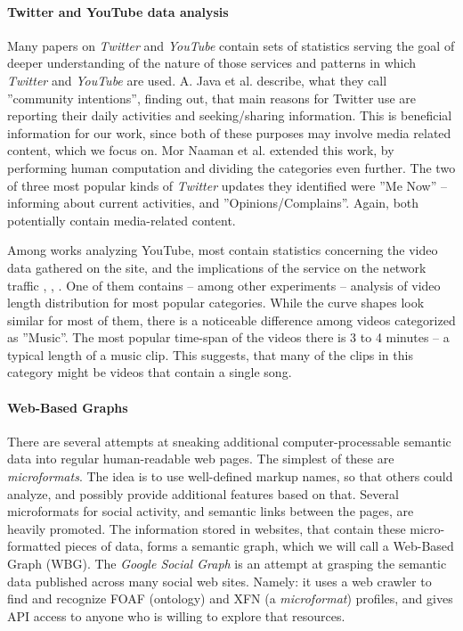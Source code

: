 \paragraph{Twitter and YouTube data analysis} Many papers on \textit{Twitter}
and \textit{YouTube} contain sets of statistics serving the goal of
deeper understanding of the nature of those services and patterns in which
\textit{Twitter} and \textit{YouTube} are used. A. Java et al. \cite{why-we-twitter}
describe, what they call ''community intentions'', finding out, that main reasons for
Twitter use are reporting their daily activities and seeking/sharing information. This
is beneficial information for our work, since both of these purposes may involve media
related content, which we focus on. Mor Naaman et al. \cite{twitter-content-is-it}
extended this work, by performing human computation and dividing the categories even further.
The two of three most popular kinds of \textit{Twitter} updates they identified were
''Me Now'' -- informing about current activities, and ''Opinions/Complains''.
Again, both potentially contain media-related content.

Among works analyzing YouTube, most contain statistics concerning the video
data gathered on the site, and the implications of the service on the network
traffic \cite{i-tube-you-tube}, \cite{views-from-the-edge},
\cite{statistics-and-social-network}. One of them
\cite{statistics-and-social-network} contains -- among other experiments --
analysis of video length distribution for most popular categories.  While the
curve shapes look similar for most of them, there is a noticeable difference
among videos categorized as ''Music''. The most popular time-span of the videos
there is 3 to 4 minutes -- a typical length of a music clip. This suggests,
that many of the clips in this category might be videos that contain a single song.

\paragraph{Web-Based Graphs} There are several attempts at sneaking additional
computer-processable semantic data into regular human-readable web pages.  The
simplest of these are \textit{microformats}. The idea is to use well-defined
markup names, so that others could analyze, and possibly provide additional
features based on that. Several microformats for social activity, and semantic
links between the pages, are heavily promoted. The information stored in
websites, that contain these micro-formatted pieces of data, forms a semantic
graph, which we will call a Web-Based Graph (WBG).  
The \textit{Google Social Graph} is an attempt at grasping
the semantic data published across many social web sites. Namely: it uses a web
crawler to find and recognize FOAF (ontology) and XFN (a \textit{microformat}) profiles,
and gives API access to anyone who is willing to explore that resources.

